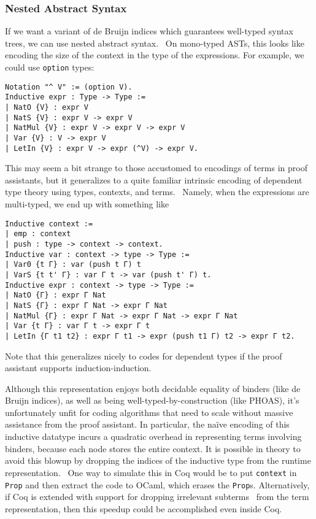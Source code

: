 \subsubsection{Nested Abstract Syntax} \label{sec:binders:nested-abstract-syntax}
If we want a variant of de Bruijn indices which guarantees well-typed syntax trees, we can use nested abstract syntax.~\cite{Nested2012Hirschowitz,deBruijn1999Bird}
On mono-typed ASTs, this looks like encoding the size of the context in the type of the expressions.
For example, we could use \texttt{option} types:~\cite{Nested2012Hirschowitz}
\begin{verbatim}
Notation "^ V" := (option V).
Inductive expr : Type -> Type :=
| NatO {V} : expr V
| NatS {V} : expr V -> expr V
| NatMul {V} : expr V -> expr V -> expr V
| Var {V} : V -> expr V
| LetIn {V} : expr V -> expr (^V) -> expr V.
\end{verbatim}

This may seem a bit strange to those accustomed to encodings of terms in proof assistants, but it generalizes to a quite familiar intrinsic encoding of dependent type theory using types, contexts, and terms.~\cite{Strongly2012Benton}
Namely, when the expressions are multi-typed, we end up with something like
\begin{verbatim}
Inductive context :=
| emp : context
| push : type -> context -> context.
Inductive var : context -> type -> Type :=
| Var0 {t Γ} : var (push t Γ) t
| VarS {t t' Γ} : var Γ t -> var (push t' Γ) t.
Inductive expr : context -> type -> Type :=
| NatO {Γ} : expr Γ Nat
| NatS {Γ} : expr Γ Nat -> expr Γ Nat
| NatMul {Γ} : expr Γ Nat -> expr Γ Nat -> expr Γ Nat
| Var {t Γ} : var Γ t -> expr Γ t
| LetIn {Γ t1 t2} : expr Γ t1 -> expr (push t1 Γ) t2 -> expr Γ t2.
\end{verbatim}

Note that this generalizes nicely to codes for dependent types if the proof assistant supports induction-induction.

Although this representation enjoys both decidable equality of binders (like de Bruijn indices), as well as being well-typed-by-construction (like PHOAS), it's unfortunately unfit for coding algorithms that need to scale without massive assistance from the proof assistant.
In particular, the na\"ive encoding of this inductive datatype incurs a quadratic overhead in representing terms involving binders, because each node stores the entire context.
It is possible in theory to avoid this blowup by dropping the indices of the inductive type from the runtime representation.~\cite{Inductive2003Brady}
One way to simulate this in Coq would be to put \texttt{context} in \texttt{Prop} and then extract the code to OCaml, which erases the \texttt{Prop}s.
Alternatively, if Coq is extended with support for dropping irrelevant subterms~\cite{sprop} from the term representation, then this speedup could be accomplished even inside Coq.

